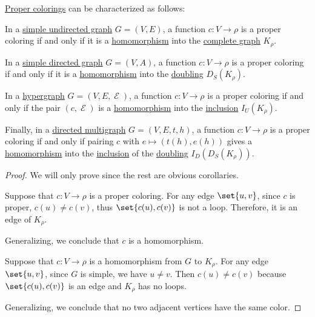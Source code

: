 \begin{proposition}\label{thm:graph_coloring_as_homomorphism}
  \hyperref[def:graph_coloring/proper]{Proper colorings} can be characterized as follows:

  \begin{thmenum}
     In a \hyperref[def:undirected_graph]{simple undirected graph} \( G = (V, E) \), a function \( c: V \to \rho \) is a proper coloring if and only if it is a \hyperref[def:undirected_graph/homomorphism]{homomorphism} into the \hyperref[def:complete_graph]{complete graph} \( K_\rho \).

     In a \hyperref[def:directed_graph]{simple directed graph} \( G = (V, A) \), a function \( c: V \to \rho \) is a proper coloring if and only if it is a \hyperref[def:directed_graph/homomorphism]{homomorphism} into the \hyperref[def:graph_functors/simple_doubling]{doubling} \( D_S(K_\rho) \).

     In a \hyperref[def:hypergraph]{hypergraph} \( G = (V, E, \mscrE) \), a function \( c: V \to \rho \) is a proper coloring if and only if the pair \( (c, \mscrE) \) is a \hyperref[def:hypergraph/homomorphism]{homomorphism} into the \hyperref[def:graph_functors/undirected_inclusion]{inclusion} \( I_U(K_\rho) \).

     Finally, in a \hyperref[def:directed_multigraph]{directed multigraph} \( G = (V, E, t, h) \), a function \( c: V \to \rho \) is a proper coloring if and only if pairing \( c \) with \( e \mapsto (t(h), e(h)) \) gives a \hyperref[def:directed_multigraph/homomorphism]{homomorphism} into the \hyperref[def:graph_functors/directed_inclusion]{inclusion} of the \hyperref[def:graph_functors/simple_doubling]{doubling} \( I_D(D_S(K_\rho)) \).
  \end{thmenum}
\end{proposition}
\begin{proof}
  We will only prove  since the rest are obvious corollaries.

  \SufficiencySubProof Suppose that \( c: V \to \rho \) is a proper coloring. For any edge \( \set{ u, v } \), since \( c \) is proper, \( c(u) \neq c(v) \), thus \( \set{ c(u), c(v) } \) is not a loop. Therefore, it is an edge of \( K_\rho \).

  Generalizing, we conclude that \( c \) is a homomorphism.

  \NecessitySubProof Suppose that \( c: V \to \rho \) is a homomorphism from \( G \) to \( K_\rho \). For any edge \( \set{ u, v } \), since \( G \) is simple, we have \( u \neq v \). Then \( c(u) \neq c(v) \) because \( \set{ c(u), c(v) } \) is an edge and \( K_\rho \) has no loops.

  Generalizing, we conclude that no two adjacent vertices have the same color.
\end{proof}

